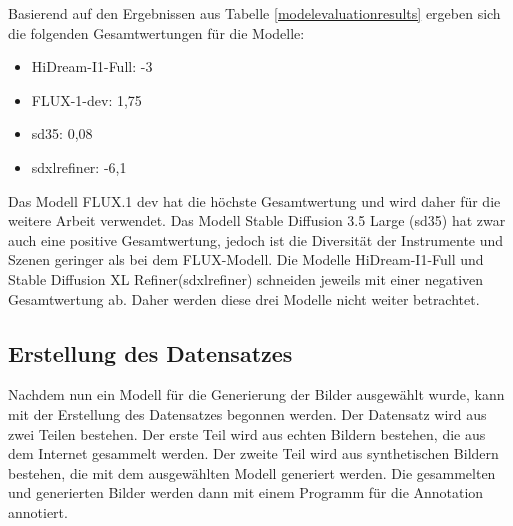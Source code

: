 Basierend auf den Ergebnissen aus Tabelle \ref{modelevaluationresults} ergeben sich die folgenden Gesamtwertungen für die Modelle:
\begin{itemize}
    \item HiDream-I1-Full: -3
    \item FLUX-1-dev: 1,75
    \item sd35: 0,08
    \item sdxlrefiner: -6,1
\end{itemize}

Das Modell FLUX.1 dev hat die höchste Gesamtwertung und wird daher für die weitere Arbeit verwendet. Das Modell Stable Diffusion 3.5 Large (sd35) hat zwar auch eine positive Gesamtwertung, jedoch ist die Diversität der Instrumente und Szenen geringer als bei dem FLUX-Modell. Die Modelle HiDream-I1-Full und Stable Diffusion XL Refiner(sdxlrefiner) schneiden jeweils mit einer negativen Gesamtwertung ab. Daher werden diese drei Modelle nicht weiter betrachtet.

\subsection{Erstellung des Datensatzes}
Nachdem nun ein Modell für die Generierung der Bilder ausgewählt wurde, kann mit der Erstellung des Datensatzes begonnen werden. Der Datensatz wird aus zwei Teilen bestehen. Der erste Teil wird aus echten Bildern bestehen, die aus dem Internet gesammelt werden. Der zweite Teil wird aus synthetischen Bildern bestehen, die mit dem ausgewählten Modell generiert werden. Die gesammelten und generierten Bilder werden dann mit einem Programm für die Annotation annotiert.

